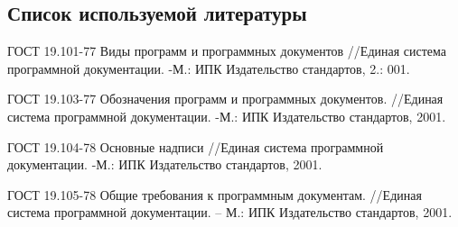 \subsection{Список используемой литературы}
\begin{my_enumerate}
\item
ГОСТ 19.101-77 Виды программ и программных документов
//Единая система программной документации. -М.: ИПК Издательство стандартов, 2.: 001.

\item
ГОСТ 19.103-77 Обозначения программ и программных документов. //Единая система программной документации. -М.: ИПК Издательство стандартов, 2001.

\item
ГОСТ 19.104-78 Основные надписи //Единая система программной документации. -М.: ИПК Издательство стандартов, 2001.

\item 
ГОСТ 19.105-78 Общие требования к программным документам. //Единая система
программной документации. – М.: ИПК Издательство стандартов, 2001.

\end{my_enumerate}

